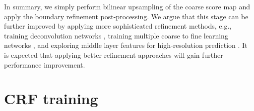 In summary, we simply perform bilinear upsampling of the coarse score map and apply the boundary refinement post-processing.
We argue that this stage can be further improved by applying more sophisticated refinement methods, e.g., training deconvolution networks \cite{noh2015learning}, 
training multiple coarse to fine learning networks \cite{eigen2015predicting}, 
and exploring middle layer features for high-resolution prediction \cite{hariharan2014hypercolumns,LongSD14}.
It is expected that applying better refinement approaches will gain further performance improvement.












\section{CRF training}

